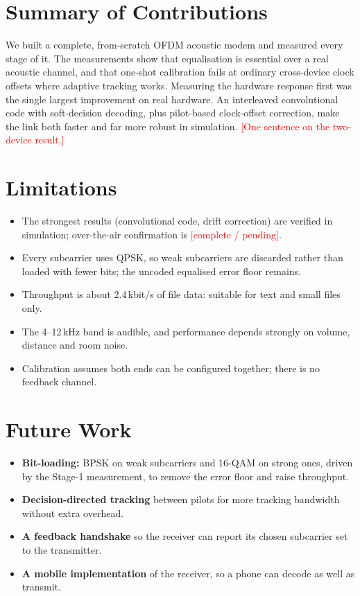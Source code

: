 \documentclass[11pt,a4paper]{report}
\newcommand{\fillin}[1]{\textcolor{red}{[#1]}}
\begin{document}
\section{Summary of Contributions}
We built a complete, from-scratch OFDM acoustic modem and measured every stage of
it. The measurements show that equalisation is essential over a real acoustic
channel, and that one-shot calibration fails at ordinary cross-device clock offsets
where adaptive tracking works. Measuring the hardware response first was the single
largest improvement on real hardware. An interleaved convolutional code with
soft-decision decoding, plus pilot-based clock-offset correction, make the link both
faster and far more robust in simulation. \fillin{One sentence on the two-device
result.}

\section{Limitations}
\begin{itemize}
    \item The strongest results (convolutional code, drift correction) are verified in
    simulation; over-the-air confirmation is \fillin{complete / pending}.
    \item Every subcarrier uses QPSK, so weak subcarriers are discarded rather than
    loaded with fewer bits; the uncoded equalised error floor remains.
    \item Throughput is about 2.4\,kbit/s of file data: suitable for text and small
    files only.
    \item The 4--12\,kHz band is audible, and performance depends strongly on volume,
    distance and room noise.
    \item Calibration assumes both ends can be configured together; there is no
    feedback channel.
\end{itemize}

\section{Future Work}
\begin{itemize}
    \item \textbf{Bit-loading:} BPSK on weak subcarriers and 16-QAM on strong ones,
    driven by the Stage-1 measurement, to remove the error floor and raise throughput.
    \item \textbf{Decision-directed tracking} between pilots for more tracking bandwidth
    without extra overhead.
    \item \textbf{A feedback handshake} so the receiver can report its chosen subcarrier
    set to the transmitter.
    \item \textbf{A mobile implementation} of the receiver, so a phone can decode as
    well as transmit.
\end{itemize}
\end{document}

